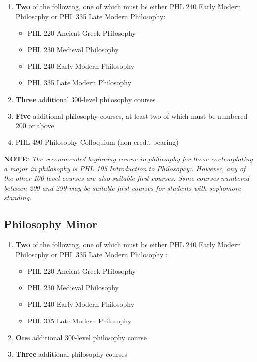 \documentclass[
  letterpaper,
]{scrbook}
\providecommand{\tightlist}{%
  \setlength{\itemsep}{0pt}\setlength{\parskip}{0pt}}
\begin{document}
\begin{enumerate}
\def\labelenumi{\arabic{enumi}.}
\item
  \textbf{Two} of the following, one of which must be either PHL 240
  Early Modern Philosophy or PHL 335 Late Modern Philosophy:

  \begin{itemize}
  \tightlist
  \item
    PHL 220 Ancient Greek Philosophy
  \item
    PHL 230 Medieval Philosophy
  \item
    PHL 240 Early Modern Philosophy
  \item
    PHL 335 Late Modern Philosophy
  \end{itemize}
\item
  \textbf{Three} additional 300-level philosophy courses
\item
  \textbf{Five} additional philosophy courses, at least two of which
  must be numbered 200 or above
\item
  PHL 490 Philosophy Colloquium (non-credit bearing)
\end{enumerate}

\textbf{NOTE:} \emph{The recommended beginning course in philosophy for
those contemplating a major in philosophy is PHL 105 Introduction to
Philosophy:. However, any of the other 100-level courses are also
suitable first courses. Some courses numbered between 200 and 299 may be
suitable first courses for students with sophomore standing.}

\subsection{Philosophy Minor}\label{philosophy-minor}

\begin{enumerate}
\def\labelenumi{\arabic{enumi}.}
\item
  \textbf{Two} of the following, one of which must be either PHL 240
  Early Modern Philosophy or PHL 335 Late Modern Philosophy :

  \begin{itemize}
  \tightlist
  \item
    PHL 220 Ancient Greek Philosophy
  \item
    PHL 230 Medieval Philosophy
  \item
    PHL 240 Early Modern Philosophy
  \item
    PHL 335 Late Modern Philosophy
  \end{itemize}
\item
  \textbf{One} additional 300-level philosophy course
\item
  \textbf{Three} additional philosophy courses
\end{enumerate}
\end{document}
